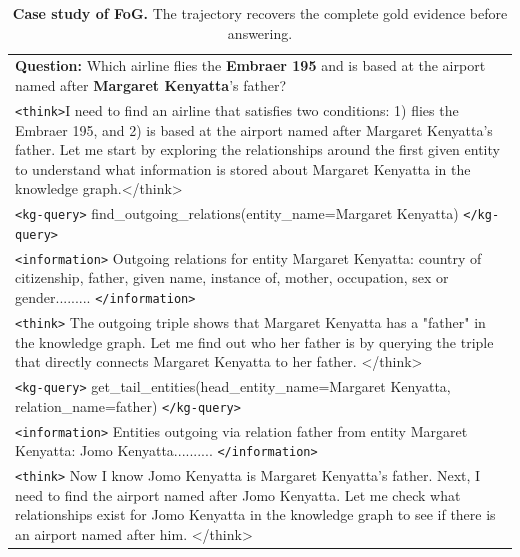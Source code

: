 \begin{table}[ht]
\centering
\footnotesize
\setlength{\tabcolsep}{8pt}
\renewcommand{\arraystretch}{1.3}
\caption{\textbf{Case study of FoG.} The trajectory recovers the complete gold evidence before answering.}

\begin{tabular}{>{\raggedright\arraybackslash}p{}}
\rowcolor{gray!20}
\textbf{Question:} Which airline flies the \textbf{Embraer 195} and is based at the airport named after \textbf{Margaret Kenyatta}'s father? \\[2pt]

\rowcolor{blue!10}
\texttt{<think>}I need to find an airline that satisfies two conditions: 1) flies the Embraer 195, and 2) is based at the airport named after Margaret Kenyatta's father. Let me start by exploring the relationships around the first given entity to understand what information is stored about Margaret Kenyatta in the knowledge graph.{</think>} \\

\rowcolor{green!10}
\texttt{<kg-query>} find\_outgoing\_relations(entity\_name=Margaret Kenyatta)  \texttt{</kg-query>} \\
\rowcolor{yellow!10}
\texttt{<information>} Outgoing relations for entity Margaret Kenyatta: country of citizenship, father, given name, instance of, mother, occupation, sex or gender......... \texttt{</information>} \\

\rowcolor{blue!10}
\texttt{<think>} The outgoing triple shows that Margaret Kenyatta has a "father" in the knowledge graph. Let me find out who her father is by querying the triple that directly connects Margaret Kenyatta to her father. {</think>} \\

\rowcolor{green!10}
\texttt{<kg-query>} get\_tail\_entities(head\_entity\_name=Margaret Kenyatta, relation\_name=father)  \texttt{</kg-query>} \\
\rowcolor{yellow!10}
\texttt{<information>} Entities outgoing via relation father from entity Margaret Kenyatta: Jomo Kenyatta.......... \texttt{</information>} \\

\rowcolor{blue!10}
\texttt{<think>} Now I know Jomo Kenyatta is Margaret Kenyatta's father. Next, I need to find the airport named after Jomo Kenyatta. Let me check what relationships exist for Jomo Kenyatta in the knowledge graph to see if there is an airport named after him. {</think>} \\


\end{tabular}
\end{table}
